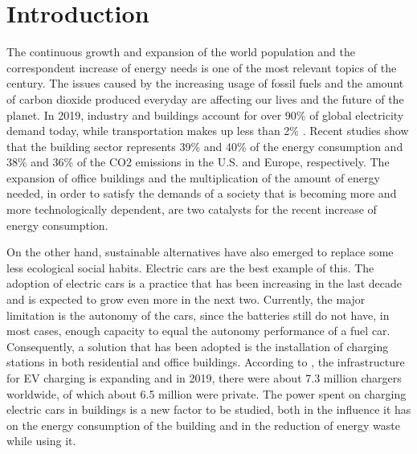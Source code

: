 \chapter{Introduction}
\label{chap:intro}

The continuous growth and expansion of the world population and the correspondent increase of energy needs is one of the most relevant topics of the century. The issues caused by the increasing usage of fossil fuels and the amount of carbon dioxide produced everyday are affecting our lives and the future of the planet. In 2019, industry and buildings account for over 90\% of global electricity demand today, while transportation makes up less than 2\% \cite{iea}. Recent studies show that the building sector represents 39\% and 40\% of the energy consumption and 38\% and 36\% of the CO2 emissions in the U.S. \cite{CivilUS} and Europe\cite{CivilEU}, respectively. The expansion of office buildings and the multiplication of the amount of energy needed, in order to satisfy the demands of a society that is becoming more and more technologically dependent, are two catalysts for the recent increase of energy consumption. 



On the other hand, sustainable alternatives have also emerged to replace some less ecological social habits. Electric cars are the best example of this. The adoption of electric cars is a practice that has been increasing in the last decade and is expected to grow even more in the next two. Currently, the major limitation is the autonomy of the cars, since the batteries still do not have, in most cases, enough capacity to equal the autonomy performance of a fuel car. Consequently, a solution that has been adopted is the installation of charging stations in both residential and office buildings. According to \cite{charger}, the infrastructure for \ac{EV} charging is expanding and in 2019, there were about 7.3 million chargers worldwide, of which about 6.5 million were private. The power spent on charging electric cars in buildings is a new factor to be studied, both in the influence it has on the energy consumption of the building and in the reduction of energy waste while using it.


